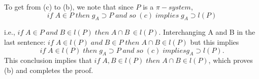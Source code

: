 \documentclass[10pt]{article}
\begin{document}
To get from (c) to (b), we note that since $P$ is a $\pi-system$, 
$$if\; A\in P\; then\; g_A \supset P \;and\; so\;(c) \;implies\; g_A \supset l(P)$$

i.e., $if\; A\in P\; and\; B \in l(P)\; then\; A\cap B \,\in l(P)$. \; Interchanging A and B in the last sentence: $if\; A\in l(P)\; and \; B \in P\; then\; A\cap B \in l(P)$ but this implies
$$if\; A\in l(P)\;then\; g_A \supset P\; and\;so\;(c)\;implies g_A \supset l(P).$$
This conclusion implies that $if\;A,B \in l(P)\; then\; A \cap B \in  l(P)$, which proves (b) and completes the proof.
\end{document}
